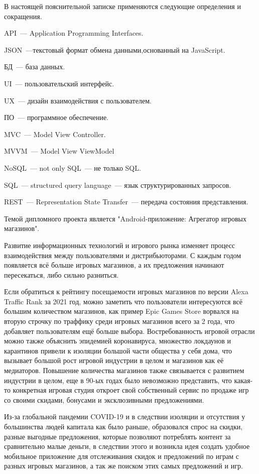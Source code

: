 \setcounter{page}{6}
В настоящей пояснительной записке применяются следующие определения и сокращения.

API~--- Application Programming Interfaces.

JSON~---текстовый формат обмена данными,основанный на JavaScript.

БД~--- база данных.

UI~--- пользовательский интерфейс.

UX~--- дизайн взаимодействия с пользователем.

ПО~--- программное обеспечение.

MVC~--- Model View Controller.

MVVM~--- Model View ViewModel

NoSQL~--- not only SQL~--- не только SQL.

SQL~--- structured query language~--- язык структурированных запросов.

REST~--- Representation State Transfer~--- передача состояния представления.
\newpage


\label{sec:intro}

Темой дипломного проекта является "Android-приложение: Агрегатор игровых магазинов".

Развитие информационных технологий и игрового рынка изменяет процесс взаимодействия между пользователями и дистрибьюторами. С каждым годом появляется всё больше игровых магазинов, а их предложения начинают пересекаться, либо сильно разниться. 

Если обратиться к рейтингу посещаемости игровых магазинов по версии Alexa Traffic Rank за 2021 год, можно заметить что пользователи интересуются всё большим количеством магазинов, как пример Epic Games Store ворвался на вторую строчку по траффику среди игровых магазинов всего за 2 года, что добавляет пользователям ещё больше выбора.
Востребованность игровой отрасли можно также объяснить эпидемией коронавируса, множество локдаунов и карантинов привели к изоляции большой части общества у себя дома, что вызывает большой рост игровой индустрии в целом и магазинов как её медиаторов.
Повышение количества магазинов также связывается с развитием индустрии в целом, еще в 90-ых годах было невозможно представить, что какая-то конкретная игровая студия откроет свой собственный сервис по продаже игр со своими скидами, бонусами и эксклюзивными предложениями.

Из-за глобальной пандемии COVID-19 и в следствии изоляции и отсутствия у большинства людей капитала как было раньше, образовался спрос на скидки, разные выгодные предложения, которые позволяют потреблять контент за сравнительно малые деньги, в следствии этого и возникла идея создать удобное мобильное приложение для отслеживания скидок и предложений по играм с разных игровых магазинов, а так же поиском этих самых предложений и игр.